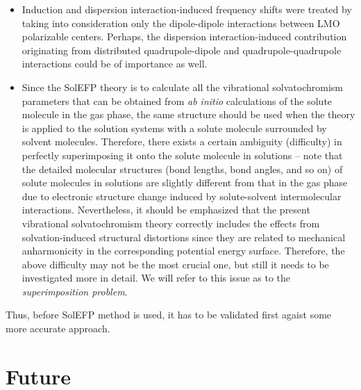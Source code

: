 \documentclass[a4paper,titlepage,twoside,fleqn,12pt]{book}
\begin{document}
\begin{refsection}
\begin{itemize}
 \item Induction and dispersion interaction\hyp{}induced frequency shifts 
were treated by taking into consideration only the dipole\hyp{}dipole interactions 
between LMO polarizable centers. Perhaps, the dispersion interaction\hyp{}induced 
contribution originating from distributed quadrupole\hyp{}dipole and quadrupole\hyp{}quadrupole 
interactions could be of importance as well.
 \item Since the SolEFP theory is to calculate all the vibrational solvatochromism parameters 
that can be obtained from \emph{ab initio} calculations of the solute molecule in the gas phase, 
the same structure should be used when the theory is applied to the solution systems 
with a solute molecule surrounded by solvent molecules. Therefore, there exists a certain 
ambiguity (difficulty) in perfectly superimposing it onto the solute molecule in solutions 
-- note that the detailed molecular structures (bond lengths, bond angles, and so on) 
of solute molecules in solutions are slightly different from that in the gas phase 
due to electronic structure change induced by solute\hyp{}solvent intermolecular interactions. 
Nevertheless, it should be emphasized that the present vibrational solvatochromism theory 
correctly includes the effects from solvation\hyp{}induced structural distortions 
since they are related to mechanical anharmonicity in the corresponding potential 
energy surface. Therefore, the above difficulty may not be the most crucial one, 
but still it needs to be investigated more in detail. We will refer to this issue as to
the \emph{superimposition problem}.
\end{itemize}
%
Thus, before SolEFP method is used, it has to be validated
first agaist some more accurate approach. 

%


\printbibliography[heading=subbibintoc,title={References}]
\end{refsection}




\chapter{Future}
\end{document}
